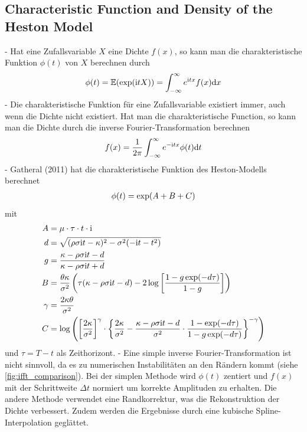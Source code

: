 \subsection{Characteristic Function and Density of the Heston Model}
- Hat eine Zufallsvariable $X$ eine Dichte $f(x)$, so kann man die charakteristische Funktion $\phi(t)$ von $X$ berechnen durch
\begin{align}
    \phi(t) = \mathbb{E}(\exp(\mathrm{i}tX)) = \int_{-\infty}^{\infty} e^{\mathrm{i}tx}f(x)\mathrm{d}x \notag
\end{align}
- Die charakteristische Funktion für eine Zufallsvariable existiert immer, auch wenn die Dichte nicht existiert. Hat man die charakteristische Function, so kann man die Dichte durch die inverse Fourier-Transformation berechnen
\begin{align}
    f(x) = \frac{1}{2\pi}\int_{-\infty}^{\infty} e^{-\mathrm{i}tx}\phi(t)\mathrm{d}t \notag
\end{align}
- Gatheral (2011) hat die charakteristische Funktion des Heston-Modells berechnet
\begin{align}
    \phi(t) = \exp(A + B + C) \notag
\end{align}
mit
\begin{align}
    A &= \mu\cdot\tau\cdot t\cdot\mathrm{i} \notag \\
    d &= \sqrt{(\rho\sigma\mathrm{i}t - \kappa)^2 - \sigma^2(-\mathrm{i}t - t^2)} \notag \\
    g &= \frac{\kappa - \rho\sigma\mathrm{i}t - d}{\kappa - \rho\sigma\mathrm{i}t + d} \notag \\
    B &= \frac{\theta\kappa}{\sigma^2}\left(\tau(\kappa - \rho\sigma\mathrm{i}t - d) - 2\log\left[\frac{1-g\exp(-d\tau)}{1-g}\right]\right) \notag \\
    \gamma &= \frac{2\kappa\theta}{\sigma^2} \notag \\
    \label{eq:heston_model_characteristic_function_C}
    C &= \log\left(\left[\frac{2\kappa}{\sigma^2}\right]^{\gamma}\cdot \left\lbrace \frac{2\kappa}{\sigma^2} - \frac{\kappa - \rho\sigma\mathrm{i}t - d}{\sigma^2}\cdot\frac{1 - \exp(-d\tau)}{1-g\exp(-d\tau)} \right\rbrace^{-\gamma}\right)
\end{align}
und $\tau = T-t$ als Zeithorizont.
- Eine simple inverse Fourier-Transformation ist nicht sinnvoll, da es zu numerischen Instabilitäten an den Rändern kommt (siehe \ref{fig:ifft_comparison}). Bei der simplen Methode wird $\phi(t)$ zentiert und $f(x)$ mit der Schrittweite $\Delta t$ normiert um korrekte Amplituden zu erhalten. Die andere Methode verwendet eine Randkorrektur, was die Rekonstruktion der Dichte verbessert. Zudem werden die Ergebnisse durch eine kubische Spline-Interpolation geglättet.

